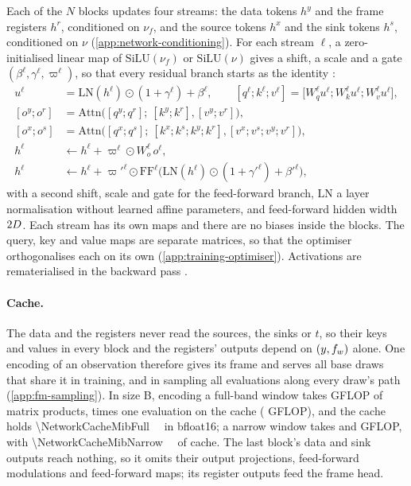 Each of the $N$ blocks updates four streams: the data tokens $h^y$ and the frame registers $h^r$,
conditioned on $\nu_f$, and the source tokens $h^x$ and the sink tokens $h^s$, conditioned on $\nu$
(\cref{app:network-conditioning}). For each stream $\ell$, a zero-initialised linear map of
$\mathrm{SiLU}(\nu_f)$ or $\mathrm{SiLU}(\nu)$ gives a shift, a scale and a gate
$(\beta^\ell,\gamma^\ell,\varpi^\ell)$, so that every residual branch starts as the identity
\citep{peebles2023scalable}:
\begin{align}
  u^\ell &= \mathrm{LN}(h^\ell)\odot(1+\gamma^\ell) + \beta^\ell,\qquad
  [q^\ell; k^\ell; v^\ell] = \bigl[W^\ell_{q}u^\ell; W^\ell_{k}u^\ell; W^\ell_{v}u^\ell\bigr], \nonumber\\
  [o^y; o^r] &= \mathrm{Attn}\bigl([q^y; q^r];\ [k^y; k^r], [v^y; v^r]\bigr),\nonumber\\
  [o^x; o^s] &= \mathrm{Attn}\bigl([q^x; q^s];\ [k^x; k^s; k^y; k^r], [v^x; v^s; v^y; v^r]\bigr), \nonumber\\
  h^\ell &\leftarrow h^\ell + \varpi^\ell\odot W^\ell_{o}\,o^\ell, \nonumber\\
  h^\ell &\leftarrow h^\ell + \varpi'^\ell\odot\mathrm{FF}^\ell\bigl(\mathrm{LN}(h^\ell)\odot(1+\gamma'^\ell) + \beta'^\ell\bigr),
  \label{eq:network-block}
\end{align}
with a second shift, scale and gate for the feed-forward branch, $\mathrm{LN}$ a layer
normalisation without learned affine parameters, and feed-forward hidden width $2{}D$.
Each stream has its own maps and there are no biases inside the blocks. The query, key and value
maps are separate matrices, so that the optimiser orthogonalises each on its own
(\cref{app:training-optimiser}). Activations are rematerialised in the backward pass
\citep{chen2016training}.

\paragraph{Cache.}
The data and the registers never read the sources, the sinks or $t$, so their keys and values in
every block and the registers' outputs depend on $(y,f_{w})$ alone. One encoding of an observation
therefore gives its frame and serves all \NetworkDraws{} base draws that share it in training, and
in sampling all  evaluations along every draw's path (\cref{app:fm-sampling}).
In size B, encoding a full-band window takes \NetworkEncodeGflopFull{} GFLOP of matrix products,
\NetworkEncodeOverDecodeFull{} times one evaluation on the cache (\NetworkDecodeGflopFull{} GFLOP),
and the cache holds \qty{\NetworkCacheMibFull}{\mebi\byte} in bfloat16; a narrow window takes
\NetworkEncodeGflopNarrow{} and \NetworkDecodeGflopNarrow{} GFLOP, with
\qty{\NetworkCacheMibNarrow}{\mebi\byte} of cache. The last block's data and sink outputs reach
nothing, so it omits their output projections, feed-forward modulations and feed-forward maps; its
register outputs feed the frame head.

